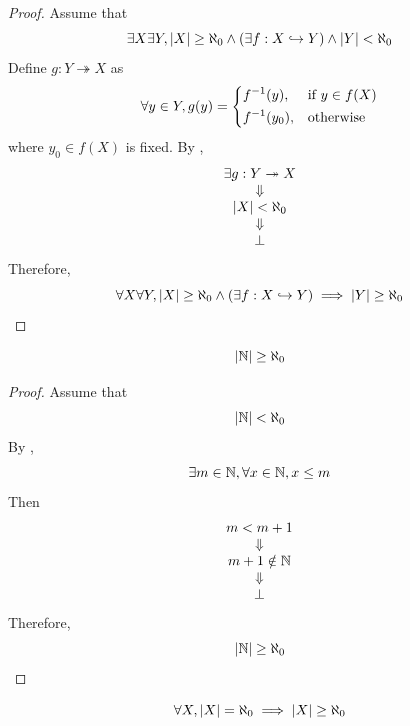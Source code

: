 \begin{proof}
    Assume that
    \[
    \exists X \exists Y, \abs*{X} \geq \aleph_{0} \land
    \paren*{\exists f: X \hookrightarrow Y} \land \abs*{Y} < \aleph_{0}
    \]
    Define $g: Y \twoheadrightarrow X$ as
    \[
    \forall y \in Y, g(y) = \begin{dcases}
        f^{-1}(y), & \text{if } y \in f(X) \\
        f^{-1}(y_{0}), & \text{otherwise}
    \end{dcases}
    \]
    where $y_{0} \in f(X)$ is fixed. By ,
    \[
    \begin{array}{c}
        \exists g: Y \twoheadrightarrow X \\
        \Downarrow \\
        \abs*{X} < \aleph_{0} \\
        \Downarrow \\
        \bot
    \end{array}
    \]
    Therefore,
    \[
    \forall X \forall Y, \abs*{X} \geq \aleph_{0} \land
    \paren*{\exists f: X \hookrightarrow Y} \implies \abs*{Y} \geq \aleph_{0}
    \]
\end{proof}

\bigskip

\begin{lemma} \label{an:lem:N-is-infinite}
    \[
    \abs*{\N} \geq \aleph_{0}
    \]
\end{lemma}

\begin{proof}
    Assume that
    \[
    \abs*{\N} < \aleph_{0}
    \]
    By ,
    \[
    \exists m \in \N, \forall x \in \N, x \leq m
    \]
    Then
    \[
    \begin{array}{c}
        m < m + 1 \\
        \Downarrow \\
        m + 1 \notin \N \\
        \Downarrow \\
        \bot
    \end{array}
    \]
    Therefore,
    \[
    \abs*{\N} \geq \aleph_{0}
    \]
\end{proof}

\bigskip

\begin{theorem} \label{an:thm:countable-set-is-infinite}
    \[
    \forall X, \abs*{X} = \aleph_{0} \implies \abs*{X} \geq \aleph_{0}
    \]
\end{theorem}

